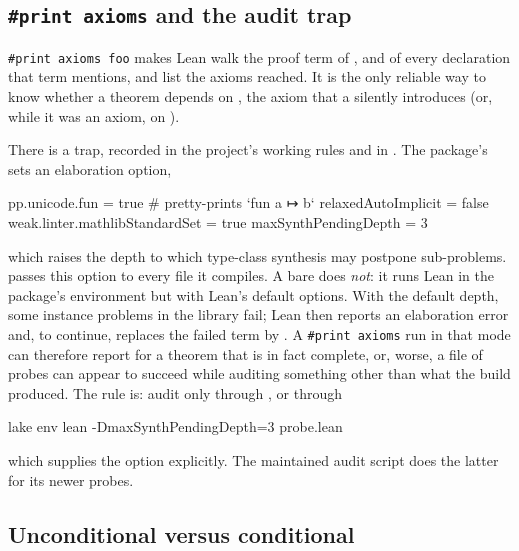 \subsection{\texorpdfstring{\texttt{\#print axioms}}{print axioms} and the audit trap}\label{ch15:sec:trap}

\texttt{\#print axioms foo} makes Lean walk the proof term of , and of every declaration
that term mentions, and list the axioms reached. It is the only reliable way to know whether a
theorem depends on , the axiom that a  silently
introduces (or, while it was an axiom, on ).

There is a trap, recorded in the project's working rules and in . The
package's  sets an elaboration option,
\begin{plaincode}
[leanOptions]
pp.unicode.fun = true # pretty-prints `fun a ↦ b`
relaxedAutoImplicit = false
weak.linter.mathlibStandardSet = true
maxSynthPendingDepth = 3
\end{plaincode}
which raises the depth to which type-class synthesis may postpone sub-problems. 
passes this option to every file it compiles. A bare  does
\emph{not}: it runs Lean in the package's environment but with Lean's default options. With the
default depth, some instance problems in the library fail; Lean then reports an elaboration error
and, to continue, replaces the failed term by . A \texttt{\#print axioms} run in that
mode can therefore report  for a theorem that is in fact complete, or, worse, a file
of probes can appear to succeed while auditing something other than what the build produced. The
rule is: audit only through , or through
\begin{plaincode}
lake env lean -DmaxSynthPendingDepth=3 probe.lean
\end{plaincode}
which supplies the option explicitly. The maintained audit script does the latter for its newer
probes.

\subsection{Unconditional versus conditional}\label{ch15:sec:uncond}

